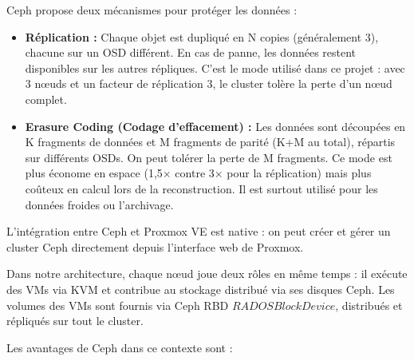 
\par Ceph propose deux mécanismes pour protéger les données :\\

\begin{itemize}

    \item \textbf{Réplication :} Chaque objet est dupliqué en N copies (généralement 3), chacune sur un OSD différent. En cas de panne, les données restent disponibles sur les autres répliques. C'est le mode utilisé dans ce projet : avec 3 n\oe{}uds et un facteur de réplication 3, le cluster tolère la perte d'un n\oe{}ud complet.

    \item \textbf{Erasure Coding (Codage d'effacement) :} Les données sont découpées en K fragments de données et M fragments de parité (K+M au total), répartis sur différents OSDs. On peut tolérer la perte de M fragments. Ce mode est plus économe en espace (1,5× contre 3× pour la réplication) mais plus coûteux en calcul lors de la reconstruction. Il est surtout utilisé pour les données froides ou l'archivage.

\end{itemize}


\par L'intégration entre Ceph et Proxmox VE est native : on peut créer et gérer un cluster Ceph directement depuis l'interface web de Proxmox.\\

\par Dans notre architecture, chaque n\oe{}ud joue deux rôles en même temps : il exécute des VMs via KVM et contribue au stockage distribué via ses disques Ceph. Les volumes des VMs sont fournis via Ceph RBD \(RADOS Block Device\), distribués et répliqués sur tout le cluster.\\

\par Les avantages de Ceph dans ce contexte sont :\\

